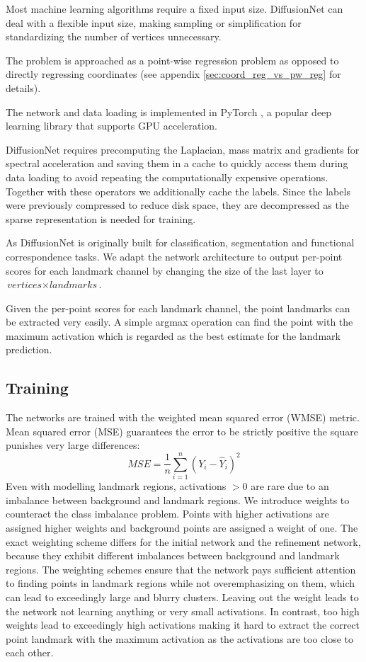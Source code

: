 \documentclass[class=article, crop=false]{standalone}
\begin{document}
Most machine learning algorithms require a fixed input size. DiffusionNet can deal with a flexible input size, making sampling or simplification for standardizing the number of vertices unnecessary.

The problem is approached as a point-wise regression problem as opposed to directly regressing coordinates (see appendix \ref{sec:coord_reg_vs_pw_reg} for details).

The network and data loading is implemented in PyTorch \cite{NEURIPS2019_9015}, a popular deep learning library that supports GPU acceleration.

DiffusionNet requires precomputing the Laplacian, mass matrix and gradients for spectral acceleration and saving them in a cache to quickly access them during data loading to avoid repeating the computationally expensive operations. Together with these operators we additionally cache the labels. Since the labels were previously compressed to reduce disk space, they are decompressed as the sparse representation is needed for training.

As DiffusionNet is originally built for classification, segmentation and functional correspondence tasks. We adapt the network architecture to output per-point scores for each landmark channel by changing the size of the last layer to $\textit{vertices} \times \textit{landmarks}$.

Given the per-point scores for each landmark channel, the point landmarks can be extracted very easily. A simple argmax operation can find the point with the maximum activation which is regarded as the best estimate for the landmark prediction.


\subsection{Training}
The networks are trained with the weighted mean squared error (WMSE) metric. Mean squared error (MSE) guarantees the error to be strictly positive the square punishes very large differences:
\begin{equation}
    MSE = \frac{1}{n}\sum^n_{i=1} (Y_i - \hat{Y}_i)^2
\end{equation}
Even with modelling landmark regions, activations $> 0$ are rare due to an imbalance between background and landmark regions. We introduce weights to counteract the class imbalance problem. Points with higher activations are assigned higher weights and background points are assigned a weight of one. The exact weighting scheme differs for the initial network and the refinement network, because they exhibit different imbalances between background and landmark regions. The weighting schemes ensure that the network pays sufficient attention to finding points in landmark regions while not overemphasizing on them, which can lead to exceedingly large and blurry clusters. Leaving out the weight leads to the network not learning anything or very small activations. In contrast, too high weights lead to exceedingly high activations making it hard to extract the correct point landmark with the maximum activation as the activations are too close to each other.
\end{document}
